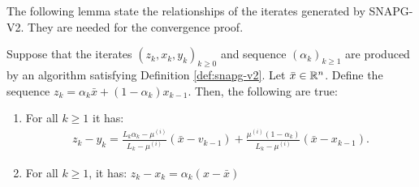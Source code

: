 \documentclass[12pt]{article}
\begin{document}
    The following lemma state the relationships of the iterates generated by SNAPG-V2. 
    They are needed for the convergence proof. 
    \begin{lemma}\label{lemma:snapg2-itrs-props}
        Suppose that the iterates $(z_k, x_k, y_k)_{k \ge 0}$ and sequence $(\alpha_k)_{k \ge 1}$ are produced by an algorithm satisfying Definition \ref{def:snapg-v2}. 
        Let $\bar x \in \mathbb R^n$.
        Define the sequence $z_k = \alpha_k\bar x + (1 - \alpha_k)x_{k - 1}$. 
        Then, the following are true: 
        \begin{enumerate}
            \item\label{lemma:snapg2-itrs-props-item1} For all $k \ge 1$ it has: 
            \begin{align*}
                    z_k - y_k 
                    = 
                    \frac{L_k\alpha_k - \mu^{(i)}}{L_k - \mu^{(i)}}(\bar x - v_{k - 1})
                    + \frac{\mu^{(i)}(1 - \alpha_k)}{L_k - \mu^{(i)}}(\bar x - x_{k - 1}).
            \end{align*}
            \item\label{lemma:snapg2-itrs-props-item2} For all $k \ge 1$, it has: $z_k - x_k = \alpha_k(x - \bar x)$
        \end{enumerate}
    \end{lemma}
\end{document}
